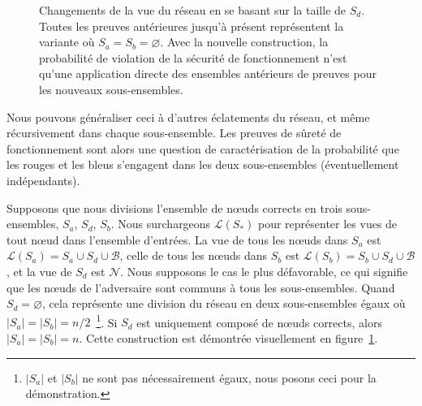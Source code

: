 \documentclass[letterpaper,twocolumn,10pt]{article}
\let\emptyset\varnothing
\theoremstyle{definition}
\begin{document}
\begin{appendices}
{\begin{figure}
\caption{Changements de la vue du réseau en se basant sur la taille de $S_d$. Toutes les preuves antérieures jusqu'à présent représentent la variante où $S_a = S_b = \emptyset$. Avec la nouvelle construction, la probabilité de violation de la sécurité de fonctionnement n'est qu'une application directe des ensembles antérieurs de preuves pour les nouveaux sous-ensembles.}
\label{fig:network_view}
\end{figure}
Nous pouvons généraliser ceci à d'autres éclatements du réseau, et même récursivement dans chaque sous-ensemble. Les preuves de sûreté de fonctionnement sont alors une question de caractérisation de la probabilité que les rouges et les bleus s'engagent dans les deux sous-ensembles (éventuellement indépendants).

Supposons que nous divisions l'ensemble de nœuds corrects en trois sous-ensembles, $S_a$, $S_d$, $S_b$. Nous surchargeons $\mathcal{L}(S_{*})$ pour représenter les vues de tout nœud dans l'ensemble d'entrées. La vue de tous les nœuds dans $S_a$ est $\mathcal{L}(S_a) = S_a \cup S_d \cup \mathcal{B}$, celle de tous les nœuds dans $S_b$ est $\mathcal{L}(S_b) = S_b \cup S_d \cup \mathcal{B}$, et la vue de $S_d$ est $\mathcal{N}$. Nous supposons le cas le plus défavorable, ce qui signifie que les nœuds de l'adversaire sont communs à tous les sous-ensembles. Quand $S_d = \emptyset$, cela représente une division du réseau en deux sous-ensembles égaux où $|S_a| = |S_b| = n/2$~\footnote{$|S_a|$ et $|S_b|$ ne sont pas nécessairement égaux, nous posons ceci pour la démonstration.}. Si $S_d$ est uniquement composé de nœuds corrects, alors $|S_a| = |S_b| = n$. Cette construction est démontrée visuellement en figure~\ref{fig:network_view}.

}
\end{appendices}
\end{document}
